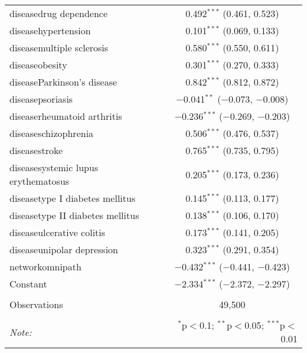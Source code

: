\begin{table}[!htbp]
\begin{tabular}{@{\extracolsep{5pt}}lc}
  diseasedrug dependence & 0.492$^{***}$ (0.461, 0.523) \\ 
  diseasehypertension & 0.101$^{***}$ (0.069, 0.133) \\ 
  diseasemultiple sclerosis & 0.580$^{***}$ (0.550, 0.611) \\ 
  diseaseobesity & 0.301$^{***}$ (0.270, 0.333) \\ 
  diseaseParkinson's disease & 0.842$^{***}$ (0.812, 0.872) \\ 
  diseasepsoriasis & $-$0.041$^{**}$ ($-$0.073, $-$0.008) \\ 
  diseaserheumatoid arthritis & $-$0.236$^{***}$ ($-$0.269, $-$0.203) \\ 
  diseaseschizophrenia & 0.506$^{***}$ (0.476, 0.537) \\ 
  diseasestroke & 0.765$^{***}$ (0.735, 0.795) \\ 
  diseasesystemic lupus erythematosus & 0.205$^{***}$ (0.173, 0.236) \\ 
  diseasetype I diabetes mellitus & 0.145$^{***}$ (0.113, 0.177) \\ 
  diseasetype II diabetes mellitus & 0.138$^{***}$ (0.106, 0.170) \\ 
  diseaseulcerative colitis & 0.173$^{***}$ (0.141, 0.205) \\ 
  diseaseunipolar depression & 0.323$^{***}$ (0.291, 0.354) \\ 
  networkomnipath & $-$0.432$^{***}$ ($-$0.441, $-$0.423) \\ 
  Constant & $-$2.334$^{***}$ ($-$2.372, $-$2.297) \\ 
 \hline \\[-1.8ex] 
Observations & 49,500 \\ 
\hline 
\hline \\[-1.8ex] 
\textit{Note:}  & \multicolumn{1}{r}{$^{*}$p$<$0.1; $^{**}$p$<$0.05; $^{***}$p$<$0.01} \\ 
\end{tabular} 
\end{table} 
